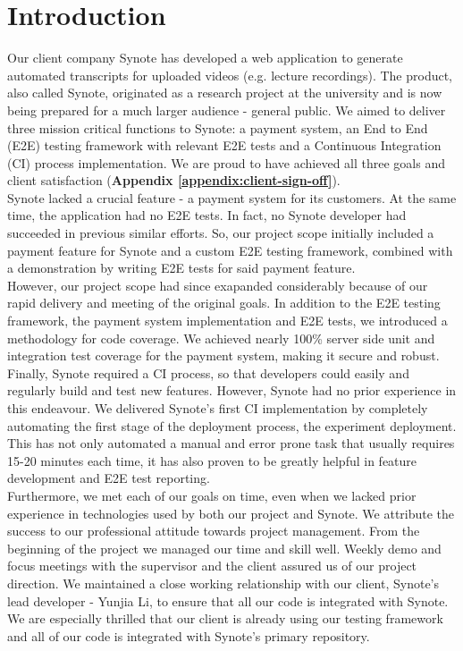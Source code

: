 \chapter{Introduction}
\label{chap:introduction}

Our client company Synote has developed a web application to generate automated transcripts for uploaded videos (e.g. lecture recordings). The product, also called Synote, originated as a research project at the university and is now being prepared for a much larger audience - general public. We aimed to deliver three mission critical functions to Synote: a payment system, an End to End (E2E) testing framework with relevant E2E tests and a Continuous Integration (CI) process implementation. We are proud to have achieved all three goals and client satisfaction (\textbf{Appendix \ref{appendix:client-sign-off}}).\\

Synote lacked a crucial feature - a payment system for its customers. At the same time, the application had no E2E tests. In fact, no Synote developer had succeeded in previous similar efforts. So, our project scope initially included a payment feature for Synote and a custom E2E testing framework, combined with a demonstration by writing E2E tests for said payment feature.\\

However, our project scope had since exapanded considerably because of our rapid delivery and meeting of the original goals. In addition to the E2E testing framework, the payment system implementation and E2E tests, we introduced a methodology for code coverage. We achieved nearly 100\% server side unit and integration test coverage for the payment system, making it secure and robust.\\

Finally, Synote required a CI process, so that developers could easily and regularly build and test new features. However, Synote had no prior experience in this endeavour. We delivered Synote's first CI implementation by completely automating the first stage of the deployment process, the experiment deployment. This has not only automated a manual and error prone task that usually requires 15-20 minutes each time, it has also proven to be greatly helpful in feature development and E2E test reporting.\\

Furthermore, we met each of our goals on time, even when we lacked prior experience in technologies used by both our project and Synote. We attribute the success to our professional attitude towards project management. From the beginning of the project we managed our time and skill well. Weekly demo and focus meetings with the supervisor and the client assured us of our project direction. We maintained a close working relationship with our client, Synote's lead developer - Yunjia Li, to ensure that all our code is integrated with Synote. We are especially thrilled that our client is already using our testing framework and all of our code is integrated with Synote's primary repository.\\

